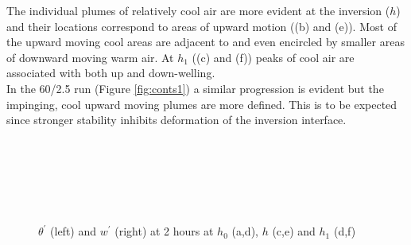 The individual plumes of relatively cool air are more evident at the inversion ($h$) and their 
locations correspond to areas of upward motion ((b) and (e)).  Most of the upward moving cool areas are adjacent to and even 
encircled by smaller areas of downward moving warm air.  At $h_{1}$ ((c) and (f)) peaks of cool air are associated 
with both up and down-welling.\\  

In the 60/2.5 run (Figure \ref{fig:conts1}) a similar progression is evident but the impinging, cool upward moving
plumes are more defined.  This is to be expected since stronger stability inhibits deformation of the 
inversion interface.\\   

\begin{figure}[htbp]
\caption{$\theta^{'}$ (left) and $w^{'}$ (right) at 2 hours at $h_{0}$ (a,d), $h$ (c,e) and $h_{1}$ (d,f)}
\begin{minipage}[b]{0.5\linewidth}
  
        \\
        \\ 
 \end{minipage}             
\quad
\begin{minipage}[b]{0.5\linewidth}
        \\
       
       \\
        
\end{minipage}
        
        \label{fig:conts}
\end{figure}

